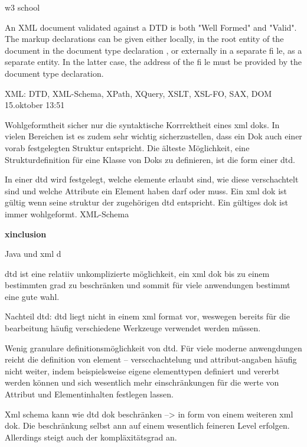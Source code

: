 
w3 school

An XML document validated against a DTD is both "Well Formed" and "Valid".  The markup declarations can be given either locally, in the root entity of the document in the document type declaration , or externally in a separate fi le, as a separate entity. In the latter case, the address of the fi le must be provided by the document type declaration.


XML: DTD, XML-Schema, XPath, XQuery, XSLT, XSL-FO, SAX, DOM 15.oktober 13:51

Wohlgeformtheit sicher nur die syntaktische Korrrektheit eines xml doks. In vielen Bereichen ist es zudem sehr wichtig sicherzustellen, dass ein Dok auch einer vorab festgelegten Struktur entspricht. Die älteste Möglichkeit, eine Strukturdefinition für eine Klasse von Doks zu definieren, ist die form einer dtd.

In einer dtd wird festgelegt, welche elemente erlaubt sind, wie diese verschachtelt sind und welche Attribute ein Element haben darf oder muss. Ein xml dok ist gültig wenn seine struktur der zugehörigen dtd entspricht. Ein gültiges dok ist immer wohlgeformt.
XML-Schema

\textbf{xinclusion}

Java und xml d

dtd ist eine relatiiv unkomplizierte möglichkeit, ein xml dok bis zu einem bestimmten grad zu beschränken und sommit für viele anwendungen bestimmt eine gute wahl.

Nachteil dtd: dtd liegt nicht in einem xml format vor, weswegen bereits für die bearbeitung häufig verschiedene Werkzeuge verwendet werden müssen.

Wenig granulare definitionsmöglichkeit von dtd. Für viele moderne anwengdungen reicht die definition von element – verscchachtelung und attribut-angaben häufig nicht weiter, indem beispielsweise eigene elementtypen definiert und vererbt werden können und sich wesentlich mehr einschränkungen für die werte von Attribut und Elementinhalten festlegen lassen.

Xml schema kann wie dtd dok beschränken --> in form von einem weiteren xml dok. Die beschränkung selbst ann auf einem wesentlich feineren Level erfolgen. Allerdings steigt auch der kompläxitätsgrad an.

